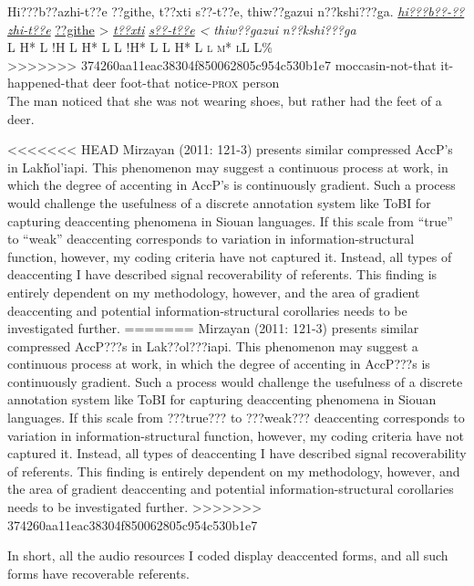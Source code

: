 \documentclass[output=paper]{LSP/langsci}
\begin{document}
\ea\label{wolfeweakdeaccenting}
Hi???b??azhi-t??e ??githe, t??xti s??-t??e, thiw??gazui n??kshi???ga.\footnotemark
\glll	\emph{\underline{hi???b??-??zhi-t??e}}	{\underline{??githe} >}				\emph{\underline{t??xti}}		\emph{\underline{s??-t??e} <}		\emph{thiw??gazui}	\emph{n??kshi???ga}\\
	{\ob L H* L}					{\cb{}!H}	{\ob L H* L\cb}			{\ob L !H* L\cb}				{\ob L H* L}			{\op \textsc{l m* l}\cp\cb{}L L\%}\\
>>>>>>> 374260aa11eac38304f850062805c954c530b1e7
	moccasin-not-that				it-happened-that					deer					foot-that				notice-\textsc{prox}		person\\
\glt	The man noticed that she was not wearing shoes, but rather had the feet of a deer.
\z

<<<<<<< HEAD
Mirzayan (2011: 121-3) presents similar compressed AccP’s in Lakȟol’iapi. This phenomenon may suggest a continuous process at work, in which the degree of accenting in AccP’s is continuously gradient. Such a process would challenge the usefulness of a discrete annotation system like ToBI for capturing deaccenting phenomena in Siouan languages. If this scale from “true” to “weak” deaccenting corresponds to variation in information-structural function, however, my coding criteria have not captured it. Instead, all types of deaccenting I have described signal recoverability of referents. This finding is entirely dependent on my methodology, however, and the area of gradient deaccenting and potential information-structural corollaries needs to be investigated further.
=======
Mirzayan (2011: 121-3) presents similar compressed AccP???s in Lak??ol???iapi. This phenomenon may suggest a continuous process at work, in which the degree of accenting in AccP???s is continuously gradient. Such a process would challenge the usefulness of a discrete annotation system like ToBI for capturing deaccenting phenomena in Siouan languages. If this scale from ???true??? to ???weak??? deaccenting corresponds to variation in information-structural function, however, my coding criteria have not captured it. Instead, all types of deaccenting I have described signal recoverability of referents. This finding is entirely dependent on my methodology, however, and the area of gradient deaccenting and potential information-structural corollaries needs to be investigated further.
>>>>>>> 374260aa11eac38304f850062805c954c530b1e7

In short, all the audio resources I coded display deaccented forms, and all such forms have recoverable referents.
\end{document}
